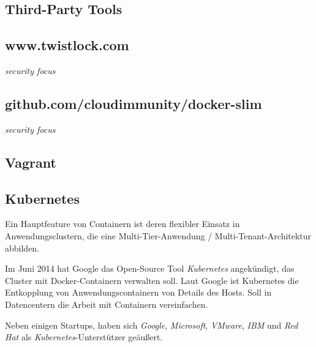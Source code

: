 \documentclass[../main.tex]{subfiles}
\begin{document}
    \subsection{Third-Party Tools}
      \subsection{www.twistlock.com}
        \emph{security focus}
      \subsection{github.com/cloudimmunity/docker-slim}
        \emph{security focus}
  		\subsection{Vagrant}
  		\subsection{Kubernetes}

        Ein Hauptfeature von Containern ist deren flexibler Einsatz in Anwendungsclustern, die eine Multi-Tier-Anwendung / Multi-Tenant-Architektur abbilden.

        Im Juni 2014 hat Google das Open-Source Tool \emph{Kubernetes} angekündigt, das Cluster mit Docker-Containern verwalten soll. Laut Google ist Kubernetes die Entkopplung von Anwendungscontainern von Details des Hosts.
        Soll in Datencentern die Arbeit mit Containern vereinfachen.

        Neben einigen Startups, haben sich \emph{Google}, \emph{Microsoft}, \emph{VMware}, \emph{IBM} und \emph{Red Hat} als \emph{Kubernetes}-Unterstützer geäußert.
\end{document}
